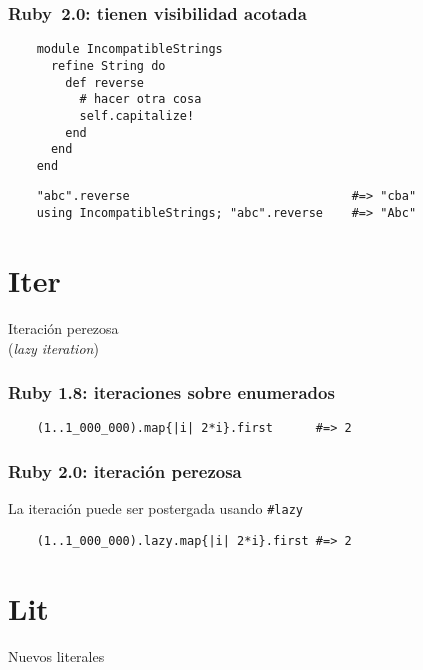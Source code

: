 \documentclass[compress]{beamer}
\begin{document}
\begin{frame}[fragile]
\frametitle{Ruby~2.0: tienen visibilidad acotada}
	\begin{lstlisting}
	module IncompatibleStrings
	  refine String do
	    def reverse
	      # hacer otra cosa
	      self.capitalize!
	    end
	  end
	end
	\end{lstlisting}
	
	\begin{lstlisting}
	"abc".reverse                               #=> "cba"
	using IncompatibleStrings; "abc".reverse    #=> "Abc"
	\end{lstlisting}
\end{frame}


\section{Iter}

\begin{frame}
	\begin{center}
		Iteración perezosa\\
		(\emph{lazy iteration})
	\end{center}
\end{frame}

\begin{frame}[fragile]
\frametitle{Ruby 1.8: iteraciones sobre enumerados}
	\begin{lstlisting}
	(1..1_000_000).map{|i| 2*i}.first      #=> 2
	\end{lstlisting}
\end{frame}


\begin{frame}[fragile]
\frametitle{Ruby 2.0: iteración perezosa}
	La iteración puede ser postergada usando \verb+#lazy+

	\begin{lstlisting}
	(1..1_000_000).lazy.map{|i| 2*i}.first #=> 2
	\end{lstlisting}
\end{frame}



\section{Lit}

\begin{frame}
	\begin{center}
	Nuevos literales
	\end{center}
\end{frame}
\end{document}
